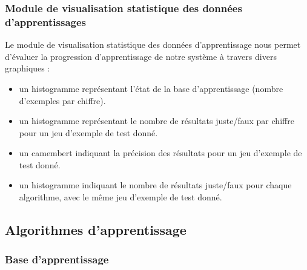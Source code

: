 \documentclass[10pt,a4paper]{report}
\begin{document}
\subsubsection{Module de visualisation statistique des données d'apprentissages}
\begin{flushleft}

Le module de visualisation statistique des données d'apprentissage nous permet d'évaluer la progression d'apprentissage de notre système à travers divers graphiques :

\begin{itemize}[label=$-$,leftmargin=*,parsep=0cm,itemsep=0.1cm,topsep=0cm]

\item un histogramme représentant l'état de la base d'apprentissage (nombre d'exemples par chiffre).

\item un histogramme représentant le nombre de résultats juste/faux par chiffre pour un jeu d'exemple de test donné.

\item un camembert indiquant la précision des résultats pour un jeu d'exemple de test donné.

\item un histogramme indiquant le nombre de résultats juste/faux pour chaque algorithme, avec le même jeu d'exemple de test donné.

\end{itemize}

\end{flushleft}

\subsection{Algorithmes d'apprentissage}

\subsubsection{Base d'apprentissage}
\end{document}
